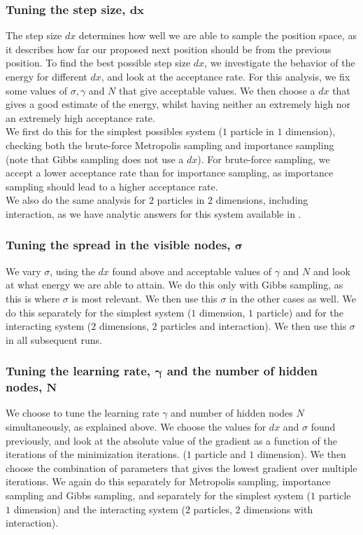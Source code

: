 \documentclass[a4paper, 10pt]{article}
\begin{document}
	\subsubsection{Tuning the step size, $\boldsymbol{dx}$}
	The step size $dx$ determines how well we are able to sample the position space, as it describes how far our proposed next position should be from the previous position. To find the best possible step size $dx$, we investigate the behavior of the energy for different $dx$, and look at the acceptance rate. For this analysis, we fix some values of $\sigma,\gamma$ and $N$ that give acceptable values. We then choose a $dx$ that gives a good estimate of the energy, whilst having neither an extremely high nor an extremely high acceptance rate.\\
	\linebreak
	We first do this for the simplest possibles system ($1$ particle in $1$ dimension), checking both the brute-force Metropolis sampling and importance sampling (note that Gibbs sampling does not use a $dx$). For brute-force sampling, we accept a lower acceptance rate than for importance sampling, as importance sampling should lead to a higher acceptance rate.\\
	\linebreak
	We also do the same analysis for $2$ particles in $2$ dimensions, including interaction, as we have analytic answers for this system available in \cite{0305-4470-27-3-040}.
	\subsubsection{Tuning the spread in the visible nodes, $\boldsymbol{\sigma}$}
	We vary $\sigma$, using the $dx$ found above and acceptable values of $\gamma$ and $N$ and look at what energy we are able to attain. We do this only with Gibbs sampling, as this is where $\sigma$ is most relevant. We then use this $\sigma$ in the other cases as well. We do this separately for the simplest system ($1$ dimension, $1$ particle) and for the interacting system ($2$ dimensions, $2$ particles and interaction). We then use this $\sigma$ in all subsequent runs. 
	\subsubsection{Tuning the learning rate, $\boldsymbol{\gamma}$ and the number of hidden nodes, $\boldsymbol{N}$}
	We choose to tune the learning rate $\gamma$ and number of hidden nodes $N$ simultaneously, as explained above. We choose the values for $dx$ and $\sigma$ found previously, and look at the absolute value of the gradient as a function of the iterations of the minimization iterations. ($1$ particle and $1$ dimension). We then choose the combination of parameters that gives the lowest gradient over multiple iterations. We again do this separately for Metropolis sampling, importance sampling and Gibbs sampling, and separately for the simplest system ($1$ particle $1$ dimension) and the interacting system ($2$ particles, $2$ dimensions with interaction).
\end{document}
